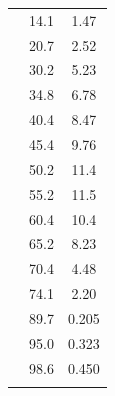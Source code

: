 \documentclass[]{tufte-handout}
\begin{document}
\begin{table}
\begin{tabular}{lSS}
 
 
        \midrule     
{}&14.1&    1.47    \\ 
 &      20.7&          2.52    \\ 
 &      30.2&          5.23    \\ 
 &      34.8&          6.78    \\ 
 &      40.4&          8.47    \\ 
 &      45.4&          9.76    \\ 
 &      50.2&         11.4    \\ 
 &      55.2&         11.5    \\ 
 &      60.4&         10.4    \\ 
 &      65.2&          8.23    \\ 
 &      70.4&          4.48    \\ 
 &      74.1&          2.20    \\ 
 &      89.7&          0.205    \\ 
 &      95.0&          0.323    \\ 
 &      98.6&          0.450    \\ 
    \label{tab:all1}

    \end{tabular} 

\end{table}
\end{document}
